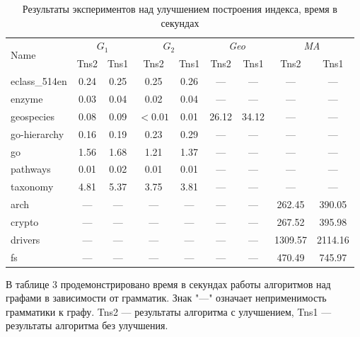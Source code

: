 \begin{table}[H]
    \begin{center}
    \begin{tabular}{| l | c | c | c | c | c | c | c | c |}
      \hline

      \multirow{2}{*}{Name}  & \multicolumn{2}{c|}{$G_1$} & \multicolumn{2}{c|}{$G_2$} & \multicolumn{2}{c|}{\textit{Geo}} & \multicolumn{2}{c|}{\textit{MA}}\\
      \cline{2-9}
                      & Tns2   & Tns1   & Tns2 & Tns1 & Tns2  & Tns1  & Tns2    & Tns1 \\
      \hline
      \hline
      eclass\_514en   & 0.24   & 0.25   & 0.25 & 0.26 & ---   & ---   & ---     & ---\\
      enzyme          & 0.03   & 0.04   & 0.02 & 0.04 & ---   & ---   & ---     & ---\\
      geospecies      & 0.08   & 0.09   & $<0.01$ & 0.01 & 26.12 & 34.12 & ---  & ---\\
      go-hierarchy    & 0.16   & 0.19   & 0.23 & 0.29 & ---   & ---   & ---     & ---\\
      go              & 1.56   & 1.68   & 1.21 & 1.37 & ---   & ---   & ---     & ---\\
      pathways        & 0.01   & 0.02   & 0.01 & 0.01 & ---   & ---   & ---     & ---\\
      taxonomy        & 4.81   & 5.37   & 3.75 & 3.81 & ---   & ---   & ---     & ---\\
      \hline
      arch            & ---    & ---    & ---  & ---  & ---   & ---   & 262.45  & 390.05  \\
      crypto          & ---    & ---    & ---  & ---  & ---   & ---   & 267.52  & 395.98  \\
      drivers         & ---    & ---    & ---  & ---  & ---   & ---   & 1309.57 & 2114.16 \\
      fs              & ---    & ---    & ---  & ---  & ---   & ---   & 470.49  & 745.97  \\
      \hline
    \end{tabular}
    \end{center}
    \caption{Результаты экспериментов над улучшением построения индекса, время в секундах}
  \end{table}

В таблице 3 продемонстрировано время в секундах работы алгоритмов над графами в зависимости от грамматик. Знак "---" означает неприменимость грамматики к графу. Tns2 --- результаты алгоритма с улучшением, Tns1 --- результаты алгоритма без улучшения.

